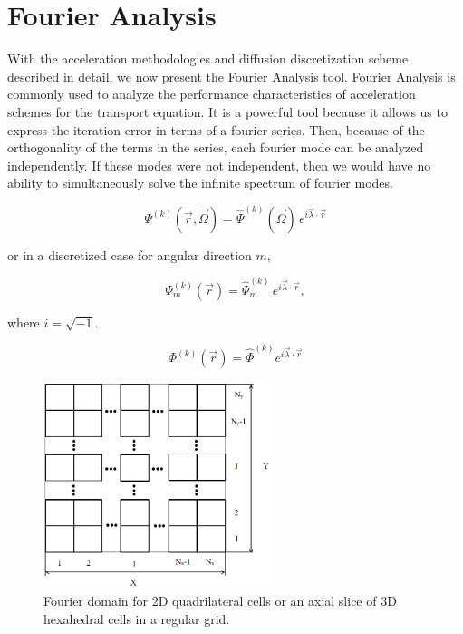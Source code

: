 \section{Fourier Analysis}
\label{sec::DSA_Fourier}

With the acceleration methodologies and diffusion discretization scheme described in detail, we now present the Fourier Analysis tool. Fourier Analysis is commonly used to analyze the performance characteristics of acceleration schemes for the transport equation. It is a powerful tool because it allows us to express the iteration error in terms of a fourier series. Then, because of the orthogonality of the terms in the series, each fourier mode can be analyzed independently. If these modes were not independent, then we would have no ability to simultaneously solve the infinite spectrum of fourier modes.


\begin{equation}
\label{eq::fourier_ang_sol}
\Psi^{(k)}  (\vec{r}, \vec{\Omega})=  \hat{\Psi}^{(k)} (\vec{\Omega}) \, e^{i \vec{\lambda} \cdot \vec{r}}
\end{equation}

\noindent or in a discretized case for angular direction $m$,

\begin{equation}
\label{eq::fourier_ang_sol_disc}
\Psi_m^{(k)}  (\vec{r})=  \hat{\Psi}_m^{(k)}  \, e^{i \vec{\lambda} \cdot \vec{r}},
\end{equation}

\noindent where $i=\sqrt{-1}$. 

\begin{equation}
\label{eq::fourier_phi_sol}
\Phi^{(k)} (\vec{r}) = \hat{\Phi}^{(k)} e^{i \vec{\lambda} \cdot \vec{r}}
\end{equation}



\begin{figure}
\centering
\includegraphics[width=0.60\textwidth]{figures/sec_DSA/fourier_sq_layout.png}
\caption[Fourier domain]{Fourier domain for 2D quadrilateral cells or an axial slice of 3D hexahedral cells in a regular grid.}
\label{fig::DSA_fourier_grid_layout}
\end{figure}


